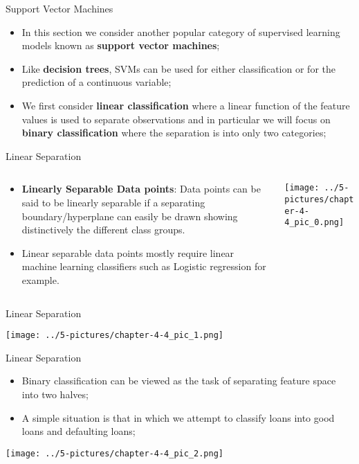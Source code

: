 \documentclass[11pt]{beamer}
\begin{document}
\begin{frame}{Support Vector Machines}
	\begin{itemize}
		\item In this section we consider another popular category of supervised learning models known as \textbf{support vector machines};
		\item Like \textbf{decision trees}, SVMs can be used for either classification or for the prediction of a continuous variable;
		\item We first consider \textbf{linear classification} where a linear function of the feature values is used to separate observations and in particular we will focus on \textbf{binary classification} where the separation is  into only two categories;
	\end{itemize}
\end{frame}
\begin{frame}{Linear Separation}
\begin{columns}[T] %
\begin{column}{.48\textwidth}
        \begin{itemize}
		\item \textbf{Linearly Separable Data points}: Data points can be said to be linearly separable if a separating boundary/hyperplane can easily be drawn showing distinctively the different class groups. 
		\item Linear separable data points mostly require linear machine learning classifiers such as Logistic regression for example.
        \end{itemize}
\end{column}%
\hfill%
\begin{column}{.48\textwidth}
        \texttt{[image: ../5-pictures/chapter-4-4\_pic\_0.png]}
\end{column}%
\end{columns}
\end{frame}
\begin{frame}{Linear Separation}
	\begin{center}
	\texttt{[image: ../5-pictures/chapter-4-4\_pic\_1.png]}
	\end{center}
\end{frame}
\begin{frame}{Linear Separation }
	\begin{itemize}
		\item Binary classification can be viewed as the task of separating feature space into two halves;
		\item A simple situation is that in which we attempt to classify loans into good loans and defaulting loans;
	\end{itemize}
	\begin{center}
	\texttt{[image: ../5-pictures/chapter-4-4\_pic\_2.png]}
	\end{center}
\end{frame}
\end{document}
